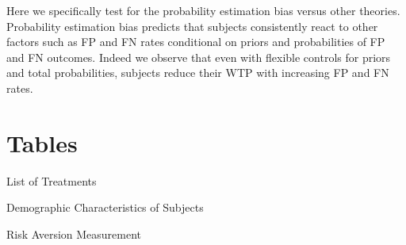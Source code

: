 \documentclass[12pt,a4paper]{article}
\begin{document}
Here we specifically test for the probability estimation bias versus other theories. Probability estimation bias predicts that subjects consistently react to other factors such as FP and FN rates conditional on priors and probabilities of FP and FN outcomes. Indeed we observe that even with flexible controls for priors and total probabilities, subjects reduce their WTP with increasing FP and FN rates.  


\newpage
\singlespacing
\small




 
\appendix

\newpage
\section{Tables}

\begin{table}[h!]
\caption{List of Treatments} \label{treaments_tab}

\end{table}

\begin{table}[h!]
\caption{Demographic Characteristics of Subjects} \label{summ_tab}

\end{table}

\begin{table}[h!]
\caption{Risk Aversion Measurement} \label{ra_tab}

\end{table}


\begin{table}[htbp!]

\end{table}


\begin{table}[hbp!]
 \label{ip_tab}
\end{table}

\begin{table}[h!]

\end{table}

\begin{table}[h!]
 \label{main_wtp_tab}
\end{table}







%
\end{document}
